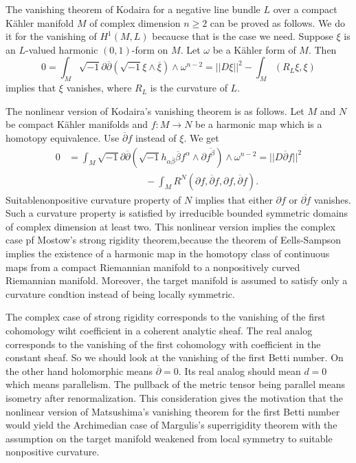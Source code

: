 The vanishing theorem of Kodaira for a negative line bundle $L$ over a compact K\"ahler manifold $M$ of complex dimension $n \geq 2$ can be proved as follows. We do it for the vanishing of $H^{1}(M, L)$ becaucse that is the case we need. Suppose $\xi$ is an $L$-valued harmonic $(0,1)$-form on $M$. Let $\omega$ be a K\"ahler form of $M$. Then
$$
0=\int_{M}\sqrt{-1}\partial \overline{\partial}(\sqrt{-1}\xi \wedge \overline{\xi})\wedge \omega^{n-2} = ||D\xi||^{2}- \int_{M}(R_{L}\xi, \xi)
$$
implies that $\xi$ vanishes, where $R_{L}$ is the curvature of $L$.

The nonlinear version of Kodaira's vanishing theorem is as follows. Let $M$ and $N$ be compact K\"ahler manifolds and $f: M \rightarrow N$ be a harmonic map which is a homotopy equivalence. Use $\overline{\partial}f$ instead of $\xi$. We get
\begin{equation*}
\begin{split}
0 &=\int_{M}\sqrt{-1}\partial \overline{\partial}(\sqrt{-1}h_{\alpha \overline{\beta}}\overline{\beta}f^{\alpha}\wedge \partial\overline{f^{\beta}})\wedge \omega^{n-2} = ||D\overline{\partial}f||^{2}\\
&\qquad \qquad \qquad \qquad -\int_{M}R^{N}(\partial f, \overline{\partial}f, \partial f, \overline{\partial}f).
\end{split}
\end{equation*}
Suitable\pageoriginale nonpositive curvature property of $N$ implies that either $\partial f$ or $\overline{\partial f}$ vanishes. Such a curvature property is satisfied by irreducible bounded symmetric domains of complex dimension at least two. This nonlinear version implies the complex case pf Mostow's strong rigidity theorem,because the theorem of Eells-Sampson implies the existence of a harmonic map in the homotopy class of continuous maps from a compact Riemannian manifold to a nonpositively curved Riemannian manifold. Moreover, the target manifold is assumed to satisfy only a curvature condtion instead of being locally symmetric.

The complex case of strong rigidity corresponds to the vanishing of the first cohomology wiht coefficient in a coherent analytic sheaf. The real analog corresponds to the vanishing of the first cohomology with coefficient in the constant sheaf. So we should look at the vanishing of the first Betti number. On the other hand holomorphic means $\overline{\partial} = 0$. Its real analog should mean $d=0$ which means parallelism. The pullback of the metric tensor being parallel means isometry after renormalization. This consideration gives the motivation that the nonlinear version of Matsushima's vanishing theorem for the first Betti number would yield the Archimedian case of Margulis's superrigidity theorem with the assumption on the target manifold weakened from local symmetry to suitable nonpositive curvature.

